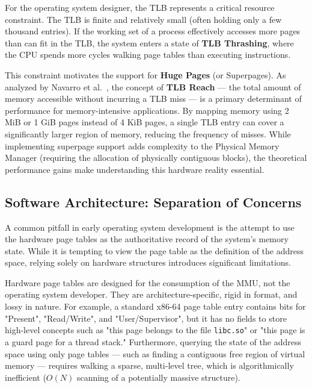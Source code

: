 \documentclass[a4paper,10pt,twoside]{report}
\theoremstyle{definition}
\begin{document}
For the operating system designer, the TLB represents a critical resource constraint. The TLB is finite and relatively small (often holding only a few thousand entries). If the working set of a process effectively accesses more pages than can fit in the TLB, the system enters a state of \textbf{TLB Thrashing}, where the CPU spends more cycles walking page tables than executing instructions.

This constraint motivates the support for \textbf{Huge Pages} (or Superpages). As analyzed by Navarro et al.~\cite{navarro2002practical}, the concept of \textbf{TLB Reach} --- the total amount of memory accessible without incurring a TLB miss --- is a primary determinant of performance for memory-intensive applications. By mapping memory using 2 MiB or 1 GiB pages instead of 4 KiB pages, a single TLB entry can cover a significantly larger region of memory, reducing the frequency of misses. While implementing superpage support adds complexity to the Physical Memory Manager (requiring the allocation of physically contiguous blocks), the theoretical performance gains make understanding this hardware reality essential.

\subsection{Software Architecture: Separation of Concerns}
\label{subsec:vmm_architecture}

A common pitfall in early operating system development is the attempt to use the hardware page tables as the authoritative record of the system's memory state. While it is tempting to view the page table as the definition of the address space, relying solely on hardware structures introduces significant limitations.

Hardware page tables are designed for the consumption of the MMU, not the operating system developer. They are architecture-specific, rigid in format, and lossy in nature. For example, a standard x86-64 page table entry contains bits for "Present", "Read/Write", and "User/Supervisor", but it has no fields to store high-level concepts such as "this page belongs to the file \texttt{libc.so}" or "this page is a guard page for a thread stack." Furthermore, querying the state of the address space using only page tables --- such as finding a contiguous free region of virtual memory --- requires walking a sparse, multi-level tree, which is algorithmically inefficient ($O(N)$ scanning of a potentially massive structure).
\end{document}
